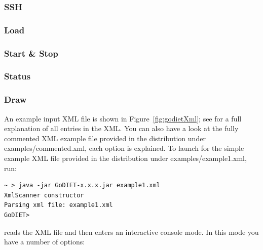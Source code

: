 \subsubsection{SSH}

\subsubsection{Load}

\subsubsection{Start & Stop}

\subsubsection{Status}

\subsubsection{Draw}

An example input XML file is shown in Figure~\ref{fig:godietXml}; see
\cite{CDa05} for a full explanation of all entries in the XML. You can also
have a look at the fully commented XML example file provided in the \godiet
distribution under examples/commented.xml, each option is explained. To launch
\godiet for the simple example XML file provided in the \godiet distribution
under examples/example1.xml, run:

\begin{verbatim}
~ > java -jar GoDIET-x.x.x.jar example1.xml
XmlScanner constructor
Parsing xml file: example1.xml
GoDIET>
\end{verbatim}

\godiet reads the XML file and then enters an interactive console mode. In this
mode you have a number of options:


